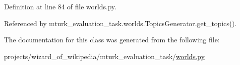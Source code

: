 Definition at line 84 of file worlds.\+py.



Referenced by mturk\+\_\+evaluation\+\_\+task.\+worlds.\+Topics\+Generator.\+get\+\_\+topics().



The documentation for this class was generated from the following file\+:\begin{DoxyCompactItemize}
\item 
projects/wizard\+\_\+of\+\_\+wikipedia/mturk\+\_\+evaluation\+\_\+task/\hyperlink{projects_2wizard__of__wikipedia_2mturk__evaluation__task_2worlds_8py}{worlds.\+py}\end{DoxyCompactItemize}
